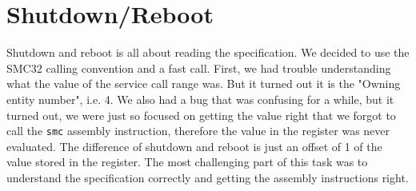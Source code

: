 \section{Shutdown/Reboot}
Shutdown and reboot is all about reading the specification. We decided to use the
SMC32 calling convention and a fast call. First, we had trouble understanding what
the value of the service call range was. But it turned out it is the "Owning
entity number", i.e. 4. We also had a bug that was confusing for a while, but it
turned out, we were just so focused on getting the value right that we forgot to
call the \texttt{smc} assembly instruction, therefore the value in the register was never
evaluated. The difference of shutdown and reboot is just an offset of 1 of the
value stored in the register. The most challenging part of this task was to
understand the specification correctly and getting the assembly instructions
right.
